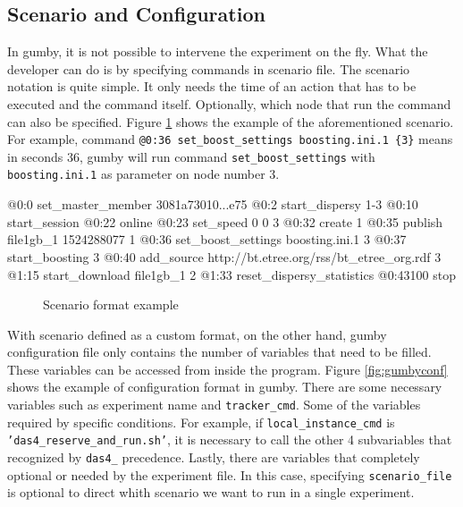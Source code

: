 \subsection{Scenario and Configuration}
In gumby, it is not possible to intervene the experiment on the fly. What the developer can do is by specifying commands in scenario file. The scenario notation is quite simple. It only needs the time of an action that has to be executed and the command itself. Optionally, which node that run the command can also be specified. Figure \ref{fig:gumbyscenario} shows the example of the aforementioned scenario. For example, command \texttt{@0:36 set\_boost\_settings boosting.ini.1 \{3\}} means in seconds 36, gumby will run command \texttt{set\_boost\_settings} with \texttt{boosting.ini.1} as parameter on node number 3. 

\begin{verbbox}
@0:0 set_master_member 3081a73010...e75
@0:2 start_dispersy {1-3}
@0:10 start_session
@0:22 online
@0:23 set_speed 0 0 {3}
@0:32 create {1}
@0:35 publish file1gb_1 1524288077 {1}
@0:36 set_boost_settings boosting.ini.1 {3}
@0:37 start_boosting {3}
@0:40 add_source http://bt.etree.org/rss/bt_etree_org.rdf {3}
@1:15 start_download file1gb_1 {2}
@1:33 reset_dispersy_statistics
@0:43100 stop
\end{verbbox}

\begin{figure}[h]
	\fbox{\theverbbox}
	\caption{Scenario format example}
	\label{fig:gumbyscenario}
\end{figure}

With scenario defined as a custom format, on the other hand, gumby configuration file only contains the number of variables that need to be filled. These variables can be accessed from inside the program. Figure \ref{fig:gumbyconf} shows the example of configuration format in gumby. There are some necessary variables such as experiment name and \texttt{tracker\_cmd}. Some of the variables required by specific conditions. For example, if \texttt{local\_instance\_cmd} is \texttt{'das4\_reserve\_and\_run.sh'}, it is necessary to call the other 4 subvariables that recognized by \texttt{das4\_} precedence. Lastly, there are variables that completely optional or needed by the experiment file. In this case, specifying \texttt{scenario\_file} is optional to direct whith scenario we want to run in a single experiment.

